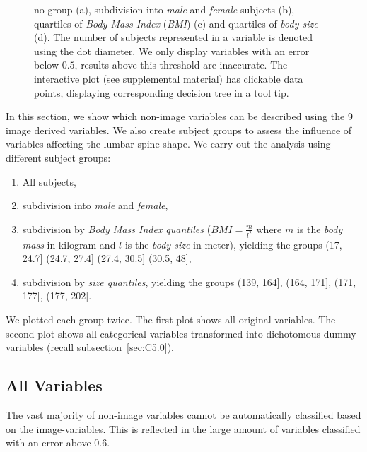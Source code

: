 \documentclass[a4paper,twoside]{style/article}
\begin{document}
\begin{figure}[p!]
{no group (a), subdivision into \emph{male} and \emph{female} subjects (b), quartiles of \emph{Body-Mass-Index} (\emph{BMI}) (c) and quartiles of \emph{body size} (d).
The number of subjects represented in a variable is denoted using the dot diameter.
We only display variables with an error below $0.5$, results above this threshold are inaccurate.
The interactive plot (see supplemental material) has clickable data points, displaying corresponding decision tree in a tool tip.
}
  \label{fig:results}
\end{figure}
\noindent In this section, we show which non-image variables can be described using the 9 image derived variables.
We also create subject groups to assess the influence of variables affecting the lumbar spine shape.
We carry out the analysis using different subject groups:
\begin{enumerate}
	\item All subjects,
	\item subdivision into \emph{male} and \emph{female},
	\item subdivision by \emph{Body Mass Index quantiles} ($BMI = \frac{m}{l^2}$ where $m$ is the \emph{body mass} in kilogram and $l$ is the \emph{body size} in meter), yielding the groups (17, 24.7] (24.7, 27.4] (27.4, 30.5] (30.5, 48],
	\item subdivision by \emph{size quantiles}, yielding the groups (139, 164], (164, 171], (171, 177], (177, 202].
\end{enumerate}
We plotted each group twice.
The first plot shows all original variables.
The second plot shows all categorical variables transformed into dichotomous dummy variables (recall subsection~\ref{sec:C5.0}).

\subsection{All Variables}
The vast majority of non-image variables cannot be automatically classified based on the image-variables.
This is reflected in the large amount of variables classified with an error above $0.6$.
\end{document}
